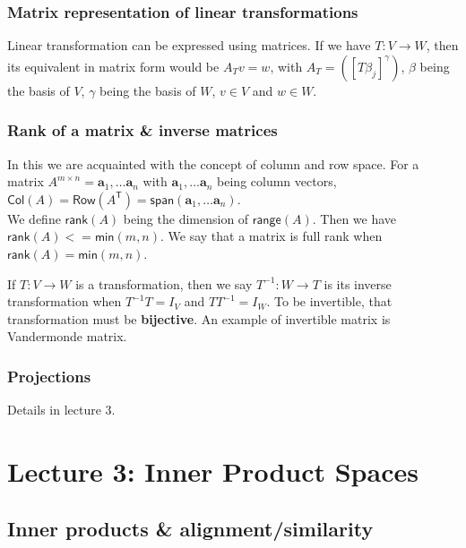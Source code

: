 \documentclass[12pt]{article}
\begin{document}
\subsubsection*{Matrix representation of linear transformations}
Linear transformation can be expressed using matrices. If we have $T: V \rightarrow W$, then its equivalent in matrix form would be $A_Tv = w$, with $A_T = ([T\beta_j]^\gamma)$, $\beta$ being the basis of $V$, $\gamma$ being the basis of $W$, $v \in V$ and $w \in W$.


\subsubsection*{Rank of a matrix \& inverse matrices}
In this we are acquainted with the concept of column and row space. For a matrix $A^{m\times n} = {\textbf{a}_1,\ldots \textbf{a}_n}$ with $\textbf{a}_1,\ldots \textbf{a}_n$ being column vectors, $\textsf{Col}(A) = \textsf{Row}(A^\textsf{T}) = \textsf{span}(\textbf{a}_1,\ldots \textbf{a}_n)$.\\
We define $\textsf{rank}(A)$ being the dimension of $\textsf{range}(A)$. Then we have $\textsf{rank}(A) <= \textsf{min}(m,n)$. We say that a matrix is full rank when $\textsf{rank}(A) = \textsf{min}(m,n)$.

If $T: V \rightarrow W$ is a transformation, then we say $T^{-1}: W \rightarrow T$ is its inverse transformation when $T^{-1}T = I_V$ and $TT^{-1}=I_W$. To be invertible, that transformation must be \textbf{bijective}. An example of invertible matrix is Vandermonde matrix.

\subsubsection*{Projections}
Details in lecture 3.

\section*{Lecture 3: Inner Product Spaces}

\subsection*{Inner products \& alignment/similarity}
\end{document}
